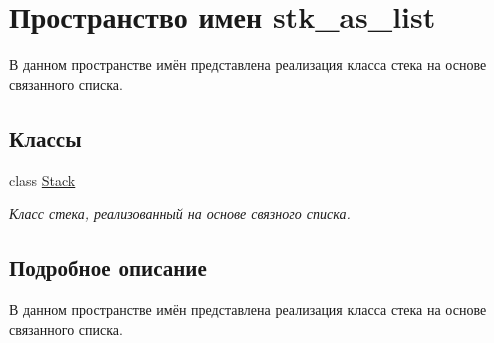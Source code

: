 \hypertarget{namespacestk__as__list}{}\section{Пространство имен stk\+\_\+as\+\_\+list}
\label{namespacestk__as__list}


В данном пространстве имён представлена реализация класса стека на основе связанного списка.  


\subsection*{Классы}
\begin{DoxyCompactItemize}
\item 
class \hyperlink{classstk__as__list_1_1_stack}{Stack}
\begin{DoxyCompactList}\small\item\em Класс стека, реализованный на основе связного списка. \end{DoxyCompactList}\end{DoxyCompactItemize}


\subsection{Подробное описание}
В данном пространстве имён представлена реализация класса стека на основе связанного списка. 